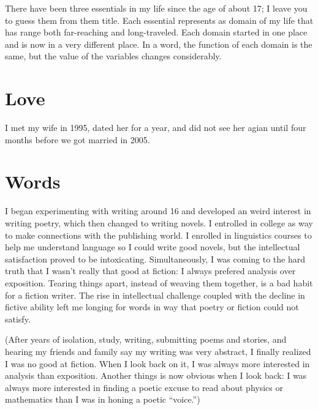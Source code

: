 There have been three essentials in my life since the age of about 17; I leave you to guess them from them title. Each essential represents as domain of my life that has range both far-reaching and long-traveled. Each domain started in one place and is now in a very different place. In a word, the function of each domain is the same, but the value of the variables changes considerably.

\section{Love}
I met my wife in 1995, dated her for a year, and did not see her agian until four months before we got married in 2005.

\section{Words}
I began experimenting with writing around 16 and developed an weird interest in writing poetry, which then changed to writing novels. I entrolled in college as way to make connections with the publishing world. I enrolled in linguistics courses to help me understand language so I could write good novels, but the intellectual satisfaction proved to be intoxicating. Simultaneously, I was coming to the hard truth that I wasn't really that good at fiction: I always prefered analysis over exposition. Tearing things apart, instead of weaving them together, is a bad habit for a fiction writer. The rise in intellectual challenge coupled with the decline in fictive ability left me longing for words in way that poetry or fiction could not satisfy.

(After years of isolation, study, writing, submitting poems and stories, and hearing my friends and family say my writing was very abstract, I finally realized I was no good at fiction. When I look back on it, I was always more interested in analysis than exposition. Another things is now obvious when I look back: I was always more interested in finding a poetic excuse to read about physics or mathematics than I was in honing a poetic ``voice.'')


